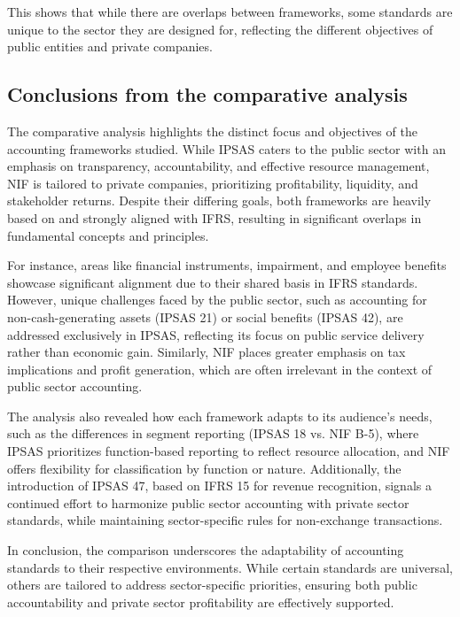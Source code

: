 \documentclass[10pt]{article}
\begin{document}
This shows that while there are overlaps between frameworks, some standards are unique to the sector they are designed for, reflecting the different objectives of public entities and private companies.

\subsection{Conclusions from the comparative analysis}\label{subsec:conclusions_from_the_comparative_analysis}
The comparative analysis highlights the distinct focus and objectives of the accounting frameworks studied. While IPSAS caters to the public sector with an emphasis on transparency, accountability, and effective resource management, NIF is tailored to private companies, prioritizing profitability, liquidity, and stakeholder returns. Despite their differing goals, both frameworks are heavily based on and strongly aligned with IFRS, resulting in significant overlaps in fundamental concepts and principles.

For instance, areas like financial instruments, impairment, and employee benefits showcase significant alignment due to their shared basis in IFRS standards. However, unique challenges faced by the public sector, such as accounting for non-cash-generating assets (IPSAS 21) or social benefits (IPSAS 42), are addressed exclusively in IPSAS, reflecting its focus on public service delivery rather than economic gain. Similarly, NIF places greater emphasis on tax implications and profit generation, which are often irrelevant in the context of public sector accounting.

The analysis also revealed how each framework adapts to its audience’s needs, such as the differences in segment reporting (IPSAS 18 vs. NIF B-5), where IPSAS prioritizes function-based reporting to reflect resource allocation, and NIF offers flexibility for classification by function or nature. Additionally, the introduction of IPSAS 47, based on IFRS 15 for revenue recognition, signals a continued effort to harmonize public sector accounting with private sector standards, while maintaining sector-specific rules for non-exchange transactions.

In conclusion, the comparison underscores the adaptability of accounting standards to their respective environments. While certain standards are universal, others are tailored to address sector-specific priorities, ensuring both public accountability and private sector profitability are effectively supported.
\end{document}
